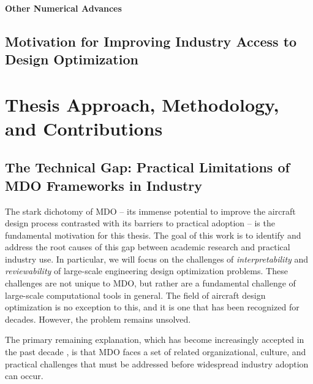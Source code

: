 \documentclass[12pt,vi,oneside]{report}
\begin{document}
    \subsubsection{Other Numerical Advances}


    \section{Motivation for Improving Industry Access to Design Optimization}


    \chapter{Thesis Approach, Methodology, and Contributions}
    \label{sec:approach}


    \section{The Technical Gap: Practical Limitations of MDO Frameworks in Industry}
    \label{sec:technical-gap}

    The stark dichotomy of MDO -- its immense potential to improve the aircraft design process contrasted with its barriers to practical adoption -- is the fundamental motivation for this thesis. The goal of this work is to identify and address the root causes of this gap between academic research and practical industry use. In particular, we will focus on the challenges of \textit{interpretability} and \textit{reviewability} of large-scale engineering design optimization problems. These challenges are not unique to MDO, but rather are a fundamental challenge of large-scale computational tools in general. The field of aircraft design optimization is no exception to this, and it is one that has been recognized for decades. However, the problem remains unsolved.


    The primary remaining explanation, which has become increasingly accepted in the past decade \cite{agte_mdo_2010, torenbeek_advanced_2013, gazaix_industrialization_2017, gpkit}, is that MDO faces a set of related organizational, culture, and practical challenges that must be addressed before widespread industry adoption can occur.
\end{document}

